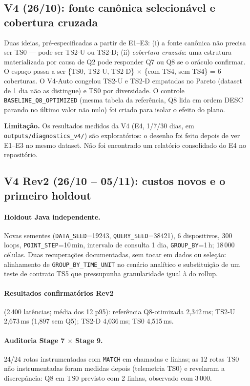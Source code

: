 \documentclass[11pt,a4paper]{article}
\newcommand{\caixa}[2][boxbg]{\par\smallskip\noindent\colorbox{#1}{\parbox{\dimexpr\linewidth-2\fboxsep}{#2}}\par\smallskip}
\newcommand{\limit}[1]{\caixa[warnbg]{\textbf{Limitação.} #1}}
\begin{document}
\subsection{V4 (26/10): fonte canônica selecionável e cobertura cruzada}
Duas ideias, pré-especificadas a partir de E1--E3: (i) a fonte canônica não precisa ser TS0 --- pode ser TS2-U ou TS2-D; (ii) \emph{cobertura cruzada}: uma estrutura materializada por causa de Q2 pode responder Q7 ou Q8 se o oráculo confirmar. O espaço passa a ser \{TS0, TS2-U, TS2-D\} $\times$ \{com TS4, sem TS4\} = 6 coberturas. O V4-Auto congelou TS2-U e TS2-D empatadas no Pareto (dataset de 1 dia não as distingue) e TS0 por diversidade. O controle \texttt{BASELINE\_Q8\_OPTIMIZED} (mesma tabela da referência, Q8 lida em ordem DESC parando no último valor não nulo) foi criado para isolar o efeito do plano.

\limit{Os resultados medidos da V4 (E4, 1/7/30 dias, em \texttt{outputs/diagnostics\_v4/}) são exploratórios: o desenho foi feito depois de ver E1--E3 no mesmo dataset. Não foi encontrado um relatório consolidado do E4 no repositório.}

\subsection{V4 Rev2 (26/10 -- 05/11): custos novos e o primeiro holdout}
\paragraph{Holdout Java independente.} Novas sementes (\texttt{DATA\_SEED}=19243, \texttt{QUERY\_SEED}=38421), 6 dispositivos, 300 loops, \texttt{POINT\_STEP}=10\,min, intervalo de consulta 1 dia, \texttt{GROUP\_BY}=1\,h; 18\,000 células. Duas recuperações documentadas, sem tocar em dados ou seleção: alinhamento de \texttt{GROUP\_BY\_TIME\_UNIT} no cenário analítico e substituição de um teste de contrato TS5 que pressupunha granularidade igual à do rollup.

\paragraph{Resultados confirmatórios Rev2} (2\,400 latências; média dos 12 p95): referência Q8-otimizada 2,342\,ms; TS2-U 2,673\,ms (1,897 sem Q5); TS2-D 4,036\,ms; TS0 4,515\,ms.

\paragraph{Auditoria Stage 7 $\times$ Stage 9.} 24/24 rotas instrumentadas com \texttt{MATCH} em chamadas e linhas; as 12 rotas TS0 não instrumentadas foram medidas depois (telemetria TS0) e revelaram a discrepância: Q8 em TS0 previsto com 2 linhas, observado com 3\,000.
\end{document}
